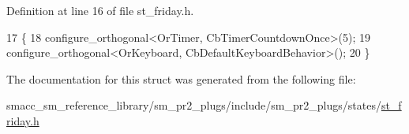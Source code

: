 Definition at line 16 of file st\+\_\+friday.\+h.


\begin{DoxyCode}
17     \{
18         configure\_orthogonal<OrTimer,  CbTimerCountdownOnce>(5);    
19         configure\_orthogonal<OrKeyboard, CbDefaultKeyboardBehavior>();
20     \}
\end{DoxyCode}


The documentation for this struct was generated from the following file\+:\begin{DoxyCompactItemize}
\item 
smacc\+\_\+sm\+\_\+reference\+\_\+library/sm\+\_\+pr2\+\_\+plugs/include/sm\+\_\+pr2\+\_\+plugs/states/\hyperlink{sm__pr2__plugs_2include_2sm__pr2__plugs_2states_2st__friday_8h}{st\+\_\+friday.\+h}\end{DoxyCompactItemize}
